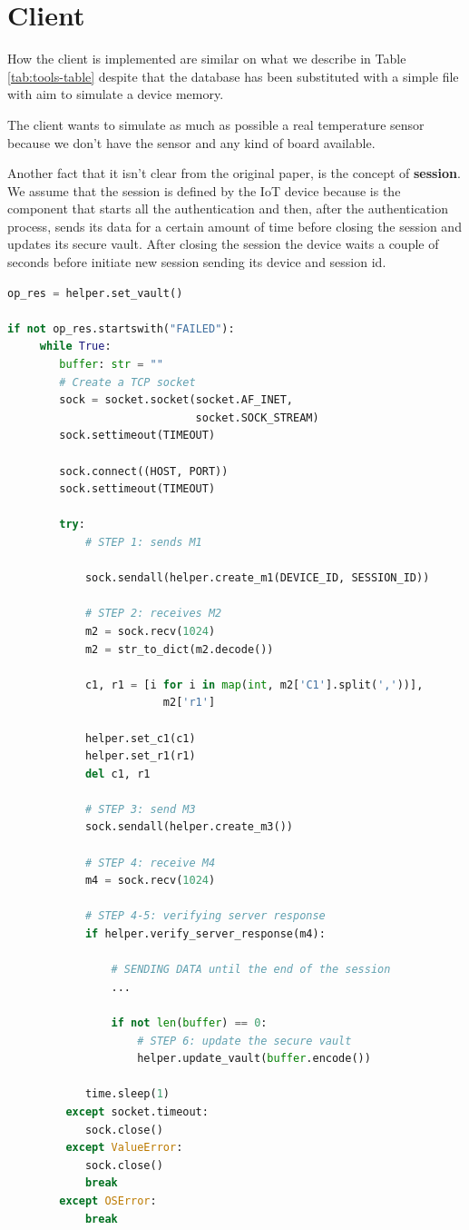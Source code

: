\section{Client}
How the client is implemented are similar on what we describe in Table \ref{tab:tools-table} despite that the database has been substituted with a simple file with aim to simulate a device memory.

The client wants to simulate as much as possible a real temperature sensor because we don't have the sensor and any kind of board available.

Another fact that it isn't clear from the original paper, is the concept of \textbf{session}. We assume that the session is defined by the IoT device because is the component that starts all the authentication and then, after the authentication process, sends its data for a certain amount of time before closing the session and updates its secure vault.
After closing the session the device waits a couple of seconds before initiate new session sending its device and session id.

\begin{lstlisting}[language=Python, basicstyle=\tiny, label={lst:client}, caption=Client logic]
op_res = helper.set_vault()

if not op_res.startswith("FAILED"):
     while True:
        buffer: str = ""
        # Create a TCP socket
        sock = socket.socket(socket.AF_INET, 
                             socket.SOCK_STREAM)
        sock.settimeout(TIMEOUT)

        sock.connect((HOST, PORT))
        sock.settimeout(TIMEOUT)

        try:
            # STEP 1: sends M1
            
            sock.sendall(helper.create_m1(DEVICE_ID, SESSION_ID))

            # STEP 2: receives M2
            m2 = sock.recv(1024)
            m2 = str_to_dict(m2.decode())

            c1, r1 = [i for i in map(int, m2['C1'].split(','))], 
                        m2['r1']

            helper.set_c1(c1)
            helper.set_r1(r1)
            del c1, r1

            # STEP 3: send M3
            sock.sendall(helper.create_m3())

            # STEP 4: receive M4
            m4 = sock.recv(1024)

            # STEP 4-5: verifying server response
            if helper.verify_server_response(m4):
                
                # SENDING DATA until the end of the session
                ...
                
                if not len(buffer) == 0:
                    # STEP 6: update the secure vault
                    helper.update_vault(buffer.encode())

            time.sleep(1)
         except socket.timeout:
            sock.close()
         except ValueError:
            sock.close()
            break
        except OSError:
            break
\end{lstlisting}

